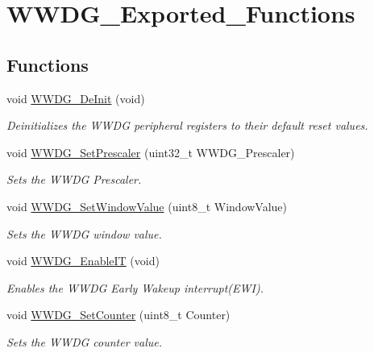 \hypertarget{group___w_w_d_g___exported___functions}{}\section{W\+W\+D\+G\+\_\+\+Exported\+\_\+\+Functions}
\label{group___w_w_d_g___exported___functions}
\subsection*{Functions}
\begin{DoxyCompactItemize}
\item 
void \mbox{\hyperlink{group___w_w_d_g___exported___functions_ga7130f4dc861b9234b62e73f9f57f89a1}{W\+W\+D\+G\+\_\+\+De\+Init}} (void)
\begin{DoxyCompactList}\small\item\em Deinitializes the W\+W\+DG peripheral registers to their default reset values. \end{DoxyCompactList}\item 
void \mbox{\hyperlink{group___w_w_d_g___exported___functions_gafeaa2b52c31ba7baca7eb61d2d42e07b}{W\+W\+D\+G\+\_\+\+Set\+Prescaler}} (uint32\+\_\+t W\+W\+D\+G\+\_\+\+Prescaler)
\begin{DoxyCompactList}\small\item\em Sets the W\+W\+DG Prescaler. \end{DoxyCompactList}\item 
void \mbox{\hyperlink{group___w_w_d_g___exported___functions_gaf44a7bf8bf6b11b41cd89ff521fdd5a5}{W\+W\+D\+G\+\_\+\+Set\+Window\+Value}} (uint8\+\_\+t Window\+Value)
\begin{DoxyCompactList}\small\item\em Sets the W\+W\+DG window value. \end{DoxyCompactList}\item 
void \mbox{\hyperlink{group___w_w_d_g___exported___functions_gac8af66ea5254d3d78b60b9b7c7f29521}{W\+W\+D\+G\+\_\+\+Enable\+IT}} (void)
\begin{DoxyCompactList}\small\item\em Enables the W\+W\+DG Early Wakeup interrupt(\+E\+W\+I). \end{DoxyCompactList}\item 
void \mbox{\hyperlink{group___w_w_d_g___exported___functions_ga6e44cc35f133b28b9ad861f459bf8d76}{W\+W\+D\+G\+\_\+\+Set\+Counter}} (uint8\+\_\+t Counter)
\begin{DoxyCompactList}\small\item\em Sets the W\+W\+DG counter value. \end{DoxyCompactList}\item 

\end{DoxyCompactItemize}
